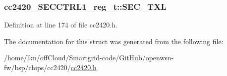 \subsubsection[{\texorpdfstring{S\+E\+C\+\_\+\+T\+XL}{SEC_TXL}}]{ cc2420\+\_\+\+S\+E\+C\+C\+T\+R\+L1\+\_\+reg\+\_\+t\+::\+S\+E\+C\+\_\+\+T\+XL}\hypertarget{structcc2420___s_e_c_c_t_r_l1__reg__t_a4a345d34c173b4c6a50caed741a94b96}{}\label{structcc2420___s_e_c_c_t_r_l1__reg__t_a4a345d34c173b4c6a50caed741a94b96}


Definition at line 174 of file cc2420.\+h.



The documentation for this struct was generated from the following file\+:\begin{DoxyCompactItemize}
\item 
/home/lkn/off\+Cloud/\+Smartgrid-\/code/\+Git\+Hub/openwsn-\/fw/bsp/chips/cc2420/\hyperlink{cc2420_8h}{cc2420.\+h}\end{DoxyCompactItemize}

